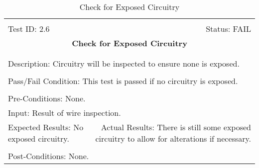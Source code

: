 \documentclass[titlepage]{article}
\begin{document}
\begin{center}
\begin{table}[h!]
\begin{tabular}{|l r|}\hline&\\[-2mm]
	Test ID: 2.6	&Status: FAIL\\[-3mm]
	\multicolumn{2}{|c|}{\textbf{\large{Check for Exposed Circuitry}}}\\&\\\hline&\\[-3mm]
	\multicolumn{2}{|p{\textwidth}|}{Description: Circuitry will be inspected to ensure none is exposed.}\\[1mm]\hline&\\[-3mm]
	\multicolumn{2}{|p{\textwidth}|}{Pass/Fail Condition: This test is passed if no circuitry is exposed.}\\[1mm]\hline&\\[-3mm]
	\multicolumn{2}{|p{\textwidth}|}{Pre-Conditions: None.}\\[4mm]
	\multicolumn{2}{|p{\textwidth}|}{Input: Result of wire inspection.}\\[2mm]\hline
	\multicolumn{1}{|p{0.49\textwidth}}{Expected Results: No exposed circuitry.}	&\multicolumn{1}{|p{0.45\textwidth}|}{Actual Results: There is still some exposed circuitry to allow for alterations if necessary.}\\\hline&\\[-3mm]
	\multicolumn{2}{|p{\textwidth}|}{Post-Conditions: None.}\\\hline
\end{tabular}
\caption{Check for Exposed Circuitry}
\end{table}
\end{center}
\end{document}

